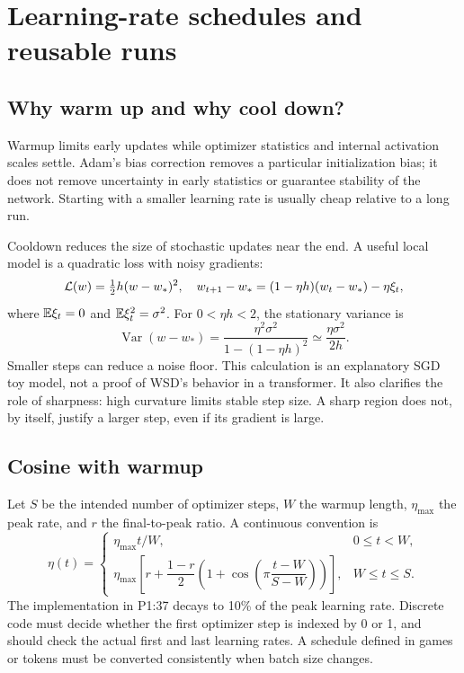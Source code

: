 \chapter{Learning-rate schedules and reusable runs}
\section{Why warm up and why cool down?}
Warmup limits early updates while optimizer statistics and internal activation scales settle. Adam's bias correction removes a particular initialization bias; it does not remove uncertainty in early statistics or guarantee stability of the network. Starting with a smaller learning rate is usually cheap relative to a long run.

Cooldown reduces the size of stochastic updates near the end. A useful local model is a quadratic loss with noisy gradients:
\begin{equation}
 \mathcal L(w)=\tfrac12h(w-w_*)^2,\quad
 w_{t+1}-w_*=(1-\eta h)(w_t-w_*)-\eta\xi_t,
\end{equation}
where $\mathbb E\xi_t=0$ and $\mathbb E\xi_t^2=\sigma^2$. For $0<\eta h<2$, the stationary variance is
\begin{equation}
 \operatorname{Var}(w-w_*)=\frac{\eta^2\sigma^2}{1-(1-\eta h)^2}
 \simeq\frac{\eta\sigma^2}{2h}.
\end{equation}
Smaller steps can reduce a noise floor. This calculation is an explanatory SGD toy model, not a proof of WSD's behavior in a transformer. It also clarifies the role of sharpness: high curvature limits stable step size. A sharp region does not, by itself, justify a larger step, even if its gradient is large.

\section{Cosine with warmup}
Let $S$ be the intended number of optimizer steps, $W$ the warmup length, $\eta_{\max}$ the peak rate, and $r$ the final-to-peak ratio. A continuous convention is
\begin{equation}
 \eta(t)=\begin{cases}
 \eta_{\max}t/W,&0\leq t<W,\\
 \eta_{\max}\left[r+\dfrac{1-r}{2}\left(1+\cos\!\left(\pi\dfrac{t-W}{S-W}\right)\right)\right],&W\leq t\leq S.
 \end{cases}
\end{equation}
The implementation in P1:37 decays to 10\% of the peak learning rate. Discrete code must decide whether the first optimizer step is indexed by 0 or 1, and should check the actual first and last learning rates. A schedule defined in games or tokens must be converted consistently when batch size changes.

